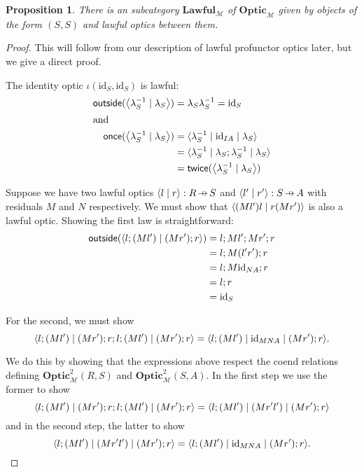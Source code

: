 \documentclass[11pt,letterpaper]{article}
\theoremstyle{plain}
\newtheorem{proposition}[theorem]{Proposition}
\theoremstyle{definition}
\newcommand{\M}{\mathscr{M}}
\newcommand{\Optic}{\mathbf{Optic}}
\newcommand{\Twoptic}{\mathbf{Optic}^2}
\newcommand{\Lawful}{\mathbf{Lawful}}
\newcommand{\id}{\mathrm{id}}
\newcommand{\rep}[2]{{\ensuremath \left\langle #1 \mid #2 \right\rangle}}
\newcommand{\repthree}[3]{{\ensuremath \langle #1 \mid #2 \mid #3 \rangle}}
\newcommand{\outside}{\mathsf{outside}}
\newcommand{\once}{\mathsf{once}}
\newcommand{\twice}{\mathsf{twice}}
\newcommand{\hto}{\ensuremath{\,\mathaccent\shortmid\rightarrow\,}}
\begin{document}
\begin{proposition}\label{prop:lawful-category}
  There is an subcategory $\Lawful_\M$ of $\Optic_\M$ given by objects of the form $(S, S)$ and lawful optics between them.
\end{proposition}
\begin{proof}
  This will follow from our description of lawful profunctor optics later, but we give a direct proof.

  The identity optic $\iota(\id_S, \id_S)$ is lawful:
  \begin{align*}
    \outside(\rep{\lambda^{-1}_S}{\lambda_{S}}) &= \lambda_{S} \lambda^{-1}_S = \id_S \\
    \intertext{and}
    \once(\rep{\lambda^{-1}_S}{\lambda_{S}})
                                                          &= \repthree{\lambda^{-1}_S}{\id_{IA}}{\lambda_{S}} \\
                                                          &= \repthree{\lambda^{-1}_S}{\lambda_{S};\lambda^{-1}_S}{\lambda_{S}} \\
                                                          &= \twice(\rep{\lambda^{-1}_S}{\lambda_{S}})
  \end{align*}

  Suppose we have two lawful optics $\rep{l}{r} : R \hto S$ and $\rep{l'}{r'} : S \hto A$ with residuals $M$ and $N$ respectively. We must show that $\rep{(Ml')l}{r (Mr')}$ is also a lawful optic. Showing the first law is straightforward:
  \begin{align*}
    \outside(\rep{l; (Ml')}{(Mr') ; r})
    &= l ; Ml' ; Mr' ; r \\
    &= l ; M(l'r') ; r \\
    &= l ; M\id_{NA} ; r \\
    &= l ; r \\
    &= \id_S
  \end{align*}

  For the second, we must show
  \[ \repthree{ l;(Ml')}{(Mr'); r;l;(Ml')}{(Mr') ; r} = \repthree{l;(Ml')}{\id_{MNA}}{(Mr') ; r}. \]

  We do this by showing that the expressions above respect the coend relations defining $\Twoptic_\M(R, S)$ and $\Twoptic_\M(S, A)$. In the first step we use the former to show
  \[ \repthree{ l;(Ml')}{(Mr'); r;l;(Ml')}{(Mr') ; r} = \repthree{l;(Ml')}{(Mr'l')}{(Mr') ; r} \]
  and in the second step, the latter to show
  \[ \repthree{ l;(Ml')}{(Mr'l')}{(Mr') ; r} = \repthree{l;(Ml')}{\id_{MNA}}{(Mr') ; r}. \]
  

\end{proof}
\end{document}
